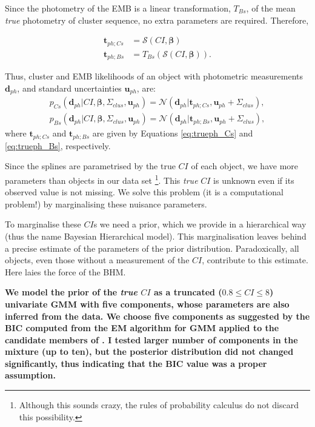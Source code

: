 Since the photometry of the EMB is a linear transformation, $T_{Bs}$, of the mean \emph{true} photometry of cluster sequence, no extra parameters are required. Therefore, 

\begin{align}
\mathbf{t}_{ph;Cs} &= \boldsymbol{\mathcal{S}}(CI, \boldsymbol{\beta}) \label{eq:trueph_Cs}\\
\mathbf{t}_{ph;Bs} &=T_{Bs}( \boldsymbol{\mathcal{S}}(CI, \boldsymbol{\beta})).
\label{eq:trueph_Bs}
\end{align}

Thus, cluster and EMB likelihoods of an object with photometric measurements $\mathbf{d}_{ph}$, and standard uncertainties $\mathbf{u}_{ph}$, are:
\begin{align}
\label{eq:lik-seq}
 p_{Cs}(\mathbf{d}_{ph}| CI, \boldsymbol{\beta},\Sigma_{clus},\mathbf{u}_{ph})={\mathcal{N}}(\mathbf{d}_{ph}|\mathbf{t}_{ph;Cs}, \mathbf{u}_{ph}+\Sigma_{clus}),\nonumber \\
p_{Bs}(\mathbf{d}_{ph}| CI, \boldsymbol{\beta},\Sigma_{clus}, \mathbf{u}_{ph})={\mathcal{N}}(\mathbf{d}_{ph}|\mathbf{t}_{ph;Bs}, \mathbf{u}_{ph}+\Sigma_{clus}),
\end{align}
where $\mathbf{t}_{ph;Cs}$ and $\mathbf{t}_{ph;Bs}$ are given by Equations \ref{eq:trueph_Cs} and \ref{eq:trueph_Bs}, respectively.

Since the splines are parametrised by the true $CI$ of each object, we have more parameters than objects in our data set \footnote{Although this sounds crazy, the rules of probability calculus do not discard this possibility.}. This \emph{true} $CI$ is unknown even if its observed value is not missing. We solve this problem (it is a computational problem!) by marginalising these nuisance parameters. 

To marginalise these $CI$s we need a prior, which we provide in a hierarchical way (thus the name Bayesian Hierarchical model). This marginalisation leaves behind a precise estimate of the parameters of the prior distribution. Paradoxically, all objects, even those without a measurement of the $CI$, contribute to this estimate. Here laies the force of the BHM.

\textbf{We model the prior of the \emph{true} $CI$ as a truncated ($0.8\leq CI \leq8$) univariate GMM with five components, whose parameters are also inferred from the data. We choose five components as suggested by the BIC computed from the EM algorithm for GMM applied to the candidate members of \citet{Bouy2015}. I tested larger number of components in the mixture (up to ten), but the posterior distribution did not changed significantly, thus indicating that the BIC value was a proper assumption.}

